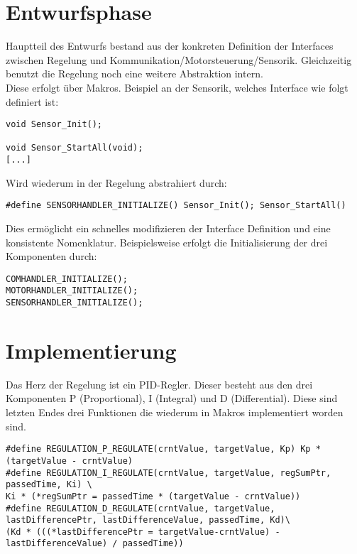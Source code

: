\section{Entwurfsphase}
Hauptteil des Entwurfs bestand aus der konkreten Definition der Interfaces zwischen Regelung und Kommunikation/Motorsteuerung/Sensorik. Gleichzeitig benutzt die Regelung noch eine weitere Abstraktion intern.\\
Diese erfolgt über Makros. Beispiel an der Sensorik, welches Interface wie folgt definiert ist:
\begin{lstlisting}[frame=single, caption=Interne Abstrahierung des Sensorik Interface]
void Sensor_Init();

void Sensor_StartAll(void);
[...]
\end{lstlisting}

Wird wiederum in der Regelung abstrahiert durch:
\begin{lstlisting}[frame=single, caption=Interne Abstrahierung des Sensorik Interface]
#define SENSORHANDLER_INITIALIZE() Sensor_Init(); Sensor_StartAll()
\end{lstlisting}
Dies ermöglicht ein schnelles modifizieren der Interface Definition und eine konsistente Nomenklatur. Beispielsweise erfolgt die Initialisierung der drei Komponenten durch:
\begin{lstlisting}[frame=single, caption=Interne Abstrahierung des Sensorik Interface]
COMHANDLER_INITIALIZE();
MOTORHANDLER_INITIALIZE();
SENSORHANDLER_INITIALIZE();
\end{lstlisting}

\section{Implementierung}
Das Herz der Regelung ist ein PID-Regler. Dieser besteht aus den drei Komponenten P (Proportional), I (Integral) und D (Differential).\cite{regl} Diese sind letzten Endes drei Funktionen die wiederum in Makros implementiert worden sind.\\

\begin{lstlisting}[frame=single, caption=Interne Abstrahierung des Sensorik Interface]
#define REGULATION_P_REGULATE(crntValue, targetValue, Kp) Kp * (targetValue - crntValue)
#define REGULATION_I_REGULATE(crntValue, targetValue, regSumPtr, passedTime, Ki) \
Ki * (*regSumPtr = passedTime * (targetValue - crntValue))
#define REGULATION_D_REGULATE(crntValue, targetValue, lastDifferencePtr, lastDifferenceValue, passedTime, Kd)\
(Kd * (((*lastDifferencePtr = targetValue-crntValue) - lastDifferenceValue) / passedTime))
\end{lstlisting}

